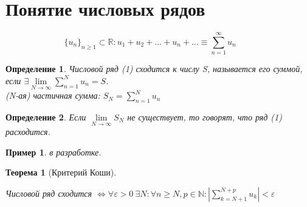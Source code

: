 \documentclass[12pt, oneside]{article}
\theoremstyle{plain}
\newtheorem{Theorem}{Теорема}
\newtheorem{Definition}{Определение}
\newtheorem{Example}{Пример}
\newcommand{\llim}{\lim\limits}
\newcommand{\lsum}{\sum\limits}
\begin{document}
	\section{Понятие числовых рядов}
	\begin{equation} \tag{1}
		\{ u_n \}_{n \geq 1} \subset \mathbb{R} : u_1 + u_2 + ... + u_n + ... \equiv 
		\sum_{n = 1}^{\infty} u_n \qquad 
	\end{equation}

	\begin{Definition}
		Числовой ряд (1) сходится к числу S, называется его суммой, если 
		\(\exists \llim_{N\to\infty} \lsum_{n=1}^{N} u_n = S \). \\
		(N-ая) частичная сумма: \(S_N = \lsum_{n=1}^{N} u_n\)
	\end{Definition}
	\begin{Definition}
		Если \(\llim_{N\to\infty}S_N\) не существует, то говорят, что ряд (1) расходится.
	\end{Definition}

	\begin{Example}
		в разработке.
	\end{Example}

	\begin{Theorem}[Критерий Коши] \

		Числовой ряд сходится \(
			\Leftrightarrow \forall \varepsilon > 0 \ \exists N : 
			\forall n \geq N, p \in \mathbb{N} : \left|\lsum_{k=N+1}^{N+p} u_k \right| < 
			\varepsilon 
		\)
	\end{Theorem}
	
\end{document}
